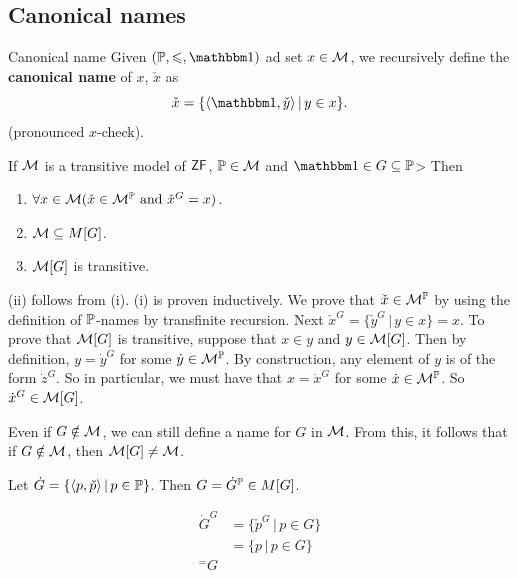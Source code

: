 \documentclass{article}
\begin{document}
\subsection{Canonical names}
\begin{fancydefine}{Canonical name}
    Given $(\bbP, \leq, \bbone)$ ad set $x \in \mathcal{M}$, we recursively define the \textbf{canonical name} of $x$, $\check{x}$ as \[ \check{x} = \{ \langle \bbone, \check{y} \rangle \, | \, y \in x \}.\] (pronounced $x$-check).
\end{fancydefine}
\begin{fancylem}{}
    If $\mathcal{M}$ is a transitive model of $\mathsf{ZF}$, $\mathbb{P} \in \mathcal{M}$ and $\bbone \in G \subseteq \bbP$> Then \begin{enumerate}
        \item[(i)] $\forall x \in \mathcal{M} (\check{x} \in \mathcal{M}^{\mathbb{P}} \text{ and } \check{x}^{G} = x)$.
        \item[(ii)] $\mathcal{M} \subseteq M[G]$.
        \item[(iii)] $\mathcal{M}[G]$ is transitive.
    \end{enumerate}
\end{fancylem}
\proof (ii) follows from (i). (i) is proven inductively. We prove that $\check{x} \in \mathcal{M}^{\mathbb{P}}$ by using the definition of $\mathbb{P}$-names by transfinite recursion. Next $\check{x}^{G} = \{ \check{y}^{G} \, | \, y \in x\} = x$. \gap
To prove that $\mathcal{M}[G]$ is transitive, suppose that $x \in y$ and $y \in \mathcal{M}[G]$. Then by definition, $y = \dot{y}^{G}$ for some $\dot{y} \in \mathcal{M}^{\mathbb{P}}$. By construction, any element of $y$ is of the form $\dot{z}^{G}$. So in particular, we must have that $x = \dot{x}^{G}$ for some $\dot{x} \in \mathcal{M}^{\mathbb{P}}$. So $\dot{x}^{G} \in \mathcal{M}[G]$. \endproof
\begin{remark*}
    Even if $G \notin \mathcal{M}$, we can still define a name for $G$ in $\mathcal{M}$. From this, it follows that if $G \notin \mathcal{M}$, then $\mathcal{M}[G]\neq \mathcal{M}$.
\end{remark*}
\begin{fancyprop}
    Let $\dot{G} = \{ \langle p, \check{p} \rangle \, | \, p \in \mathbb{P}\}$. Then $G = \dot{G}^{\mathbb{P}} \in M[G]$.
\end{fancyprop}
\proof
\begin{align*}
    \dot{G}^{G} & = \{ \check{p}^{G} \, | \, p \in G \} \\
                & = \{ p \, | \, p \in G \}             \\
    ^= G
\end{align*}
\end{document}
